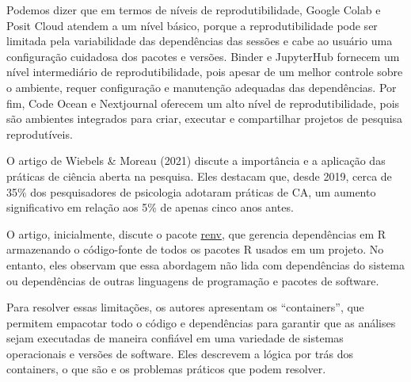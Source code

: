 \documentclass[
  a4paper,
]{book}
\begin{document}
Podemos dizer que em termos de níveis de reprodutibilidade, Google Colab
e Posit Cloud atendem a um nível básico, porque a reprodutibilidade pode
ser limitada pela variabilidade das dependências das sessões e cabe ao
usuário uma configuração cuidadosa dos pacotes e versões. Binder e
JupyterHub fornecem um nível intermediário de reprodutibilidade, pois
apesar de um melhor controle sobre o ambiente, requer configuração e
manutenção adequadas das dependências. Por fim, Code Ocean e Nextjournal
oferecem um alto nível de reprodutibilidade, pois são ambientes
integrados para criar, executar e compartilhar projetos de pesquisa
reprodutíveis.

\begin{tcolorbox}[enhanced jigsaw, colback=white, coltitle=black, bottomrule=.15mm, rightrule=.15mm, title=\textcolor{quarto-callout-note-color}{\faInfo}\hspace{0.5em}{\emph{Leveraging Containers for Reproducible Psychological Research}
(Tip~\ref{tip-prompt})}, colframe=quarto-callout-note-color-frame, titlerule=0mm, bottomtitle=1mm, toptitle=1mm, opacityback=0, arc=.35mm, toprule=.15mm, opacitybacktitle=0.6, left=2mm, leftrule=.75mm, breakable, colbacktitle=quarto-callout-note-color!10!white]

O artigo de Wiebels \& Moreau (2021) discute a importância e a aplicação
das práticas de ciência aberta na pesquisa. Eles destacam que, desde
2019, cerca de 35\% dos pesquisadores de psicologia adotaram práticas de
CA, um aumento significativo em relação aos 5\% de apenas cinco anos
antes.\vspace{0.5em}

O artigo, inicialmente, discute o pacote
\href{https://rstudio.github.io/renv/articles/renv.html}{renv}, que
gerencia dependências em R armazenando o código-fonte de todos os
pacotes R usados em um projeto. No entanto, eles observam que essa
abordagem não lida com dependências do sistema ou dependências de outras
linguagens de programação e pacotes de software.\vspace{0.5em}

Para resolver essas limitações, os autores apresentam os ``containers'',
que permitem empacotar todo o código e dependências para garantir que as
análises sejam executadas de maneira confiável em uma variedade de
sistemas operacionais e versões de software. Eles descrevem a lógica por
trás dos containers, o que são e os problemas práticos que podem
resolver.\vspace{0.5em}


\end{tcolorbox}
\end{document}
